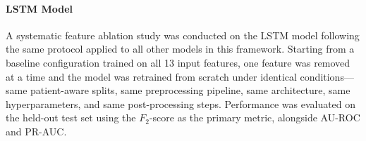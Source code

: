 \documentclass[conference]{IEEEtran}
\begin{document}
\begin{table}[H]
    \centering
    \caption{Full Feature Ablation Results for the Proposed Ensemble Model (Sorted by F2 Impact)}
    \label{tab:full_feature_ablation}
    \renewcommand{\arraystretch}{1.2}
\end{table}

\paragraph{LSTM Model}

A systematic feature ablation study was conducted on the LSTM model 
following the same protocol applied to all other models in this framework. 
Starting from a baseline configuration trained on all 13 input features, 
one feature was removed at a time and the model was retrained from scratch 
under identical conditions—same patient-aware splits, same preprocessing 
pipeline, same architecture, same hyperparameters, and same post-processing 
steps. Performance was evaluated on the held-out test set using the 
$F_2$-score as the primary metric, alongside AU-ROC and PR-AUC.
\end{document}

